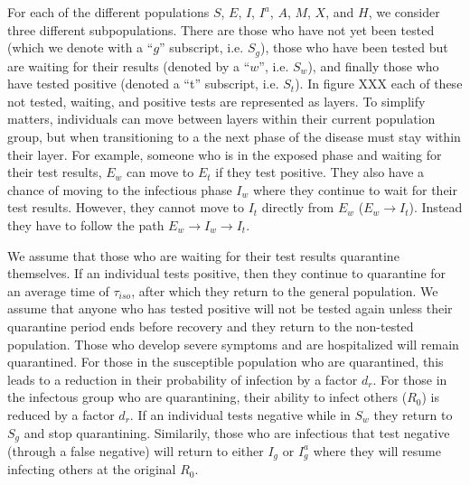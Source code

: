 \documentclass[notitlepage, superscriptaddress]{revtex4-2}
\begin{document}
For each of the different populations $S$, $E$, $I$, $I^{a}$, $A$, $M$, $X$, and $H$, we consider three different subpopulations. There are those who have not yet been tested (which we denote with a ``$g$'' subscript, i.e. $S_{g}$), those who have been tested but are waiting for their results (denoted by a ``$w$'', i.e. $S_{w}$), and finally those who have tested positive (denoted a ``t'' subscript, i.e. $S_{t}$). In figure XXX each of these not tested, waiting, and positive tests are represented as layers. To simplify matters, individuals can move between layers within their current population group, but when transitioning to a the next phase of the disease must stay within their layer. For example, someone who is in the exposed phase and waiting for their test results, $E_{w}$ can move to $E_{t}$ if they test positive. They also have a chance of moving to the infectious phase $I_{w}$ where they continue to wait for their test results. However, they cannot move to $I_{t}$ directly from $E_{w}$ ($E_{w} \rightarrow I_{t}$). Instead they have to follow the path $E_{w} \rightarrow I_{w} \rightarrow I_{t}$.  

We assume that those who are waiting for their test results quarantine themselves. If an individual tests positive, then they continue to quarantine for an average time of $\tau_{iso}$, after which they return to the general population. We assume that anyone who has tested positive will not be tested again unless their quarantine period ends before recovery and they return to the non-tested population. Those who develop severe symptoms and are hospitalized will remain quarantined. For those in the susceptible population who are quarantined, this leads to a reduction in their probability of infection by a factor $d_{r}$. For those in the infectous group who are quarantining, their ability to infect others ($R_{0}$) is reduced by a factor $d_{r}$. If an individual tests negative while in $S_{w}$ they return to $S_{g}$ and stop quarantining. Similarily, those who are infectious that test negative (through a false negative) will return to either $I_{g}$ or $I^{a}_{g}$ where they will resume infecting others at the original $R_{0}$.  
\end{document}
